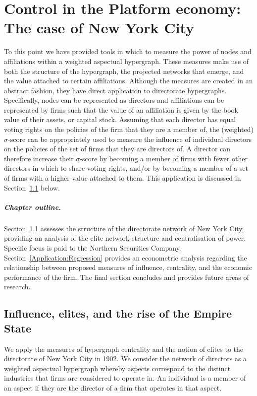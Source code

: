 \chapter{Control in the Platform economy: The case of New York City}

To this point we have provided tools in which to measure the power of nodes and affiliations within a weighted aspectual hypergraph. These measures make use of both the structure of the hypergraph, the projected networks that emerge, and the value attached to certain affiliations. Although the measures are created in an abstract fashion, they have direct application to directorate hypergraphs. Specifically, nodes can be represented as directors and affiliations can be represented by firms such that the value of an affiliation is given by the book value of their assets, or capital stock. Assuming that each director has equal voting rights on the policies of the firm that they are a member of, the (weighted) $\sigma$-score can be appropriately used to measure the influence of individual directors on the policies of the set of firms that they are directors of. A director can therefore increase their $\sigma$-score by becoming a member of firms with fewer other directors in which to share voting rights, and/or by becoming a member of a set of firms with a higher value attached to them. This application is discussed in Section~\ref{Application:Network} below.

\paragraph{Chapter outline.}

Section~\ref{Application:Network} assesses the structure of the directorate network of New York City, providing an analysis of the elite network structure and centralisation of power. Specific focus is paid to the Northern Securities Company. Section~\ref{Application:Regression} provides an econometric analysis regarding the relationship between proposed measures of influence, centrality, and the economic performance of the firm. The final section concludes and provides future areas of research.

\section{Influence, elites, and the rise of the Empire State} \label{Application:Network}

We apply the measures of hypergraph centrality and the notion of elites to the directorate of New York City in 1902. We consider the network of directors as a weighted aspectual hypergraph whereby aspects correspond to the distinct industries that firms are considered to operate in. An individual is a member of an aspect if they are the director of a firm that operates in that aspect.

